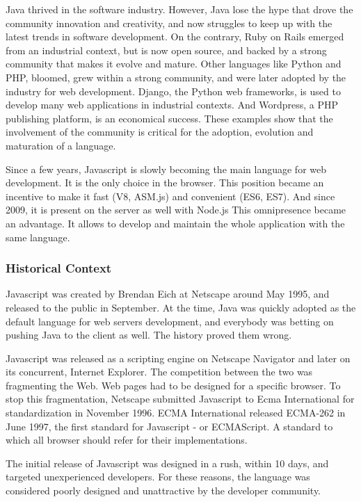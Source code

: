 Java thrived in the software industry.
However, Java lose the hype that drove the community innovation and creativity, and now struggles to keep up with the latest trends in software development.
On the contrary, Ruby on Rails emerged from an industrial context, but is now open source, and backed by a strong community that makes it evolve and mature.
Other languages like Python and PHP, bloomed, grew within a strong community, and were later adopted by the industry for web development.
Django, the Python web frameworks, is used to develop many web applications in industrial contexts.
And Wordpress, a PHP publishing platform, is an economical success.
These examples show that the involvement of the community is critical for the adoption, evolution and maturation of a language.

Since a few years, Javascript is slowly becoming the main language for web development.
It is the only choice in the browser.
This position became an incentive to make it fast (V8, ASM.js) and convenient (ES6, ES7).
And since 2009, it is present on the server as well with Node.js
This omnipresence became an advantage.
It allows to develop and maintain the whole application with the same language.

\subsubsection{Historical Context}

Javascript was created by Brendan Eich at Netscape around May 1995, and released to the public in September.
At the time, Java was quickly adopted as the default language for web servers development, and everybody was betting on pushing Java to the client as well.
The history proved them wrong.

Javascript was released as a scripting engine on Netscape Navigator and later on its concurrent, Internet Explorer.
The competition between the two was fragmenting the Web.
Web pages had to be designed for a specific browser.
To stop this fragmentation, Netscape submitted Javascript to Ecma International for standardization in November 1996.
ECMA International released ECMA-262 in June 1997, the first standard for Javascript - or ECMAScript.
A standard to which all browser should refer for their implementations.

The initial release of Javascript was designed in a rush, within 10 days, and targeted unexperienced developers.
For these reasons, the language was considered poorly designed and unattractive by the developer community.


